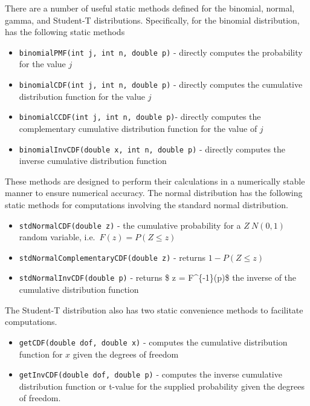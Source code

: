 \documentclass[
]{book}
\providecommand{\tightlist}{%
  \setlength{\itemsep}{0pt}\setlength{\parskip}{0pt}}
\theoremstyle{definition}
\theoremstyle{definition}
\theoremstyle{definition}
\theoremstyle{definition}
\theoremstyle{remark}
\begin{document}
There are a number of useful static methods defined for the binomial, normal, gamma, and Student-T distributions. Specifically, for the binomial distribution, has the following static methods

\begin{itemize}
\tightlist
\item
  \texttt{binomialPMF(int\ j,\ int\ n,\ double\ p)} - directly computes the probability for the value \(j\)
\item
  \texttt{binomialCDF(int\ j,\ int\ n,\ double\ p)} - directly computes the cumulative distribution function for the value \(j\)
\item
  \texttt{binomialCCDF(int\ j,\ int\ n,\ double\ p)}- directly computes the complementary cumulative distribution function for the value of \(j\)
\item
  \texttt{binomialInvCDF(double\ x,\ int\ n,\ double\ p)} - directly computes the inverse cumulative distribution function
\end{itemize}

These methods are designed to perform their calculations in a numerically stable manner to ensure numerical accuracy. The normal distribution has the following static methods for computations involving the standard normal distribution.

\begin{itemize}
\tightlist
\item
  \texttt{stdNormalCDF(double\ z)} - the cumulative probability for a \(Z ~ N(0,1)\) random variable, i.e.~\(F(z) = P(Z \leq z)\)
\item
  \texttt{stdNormalComplementaryCDF(double\ z)} - returns \(1-P(Z \leq z)\)
\item
  \texttt{stdNormalInvCDF(double\ p)} - returns \$ z = F\^{}\{-1\}(p)\$ the inverse of the cumulative distribution function
\end{itemize}

The Student-T distribution also has two static convenience methods to facilitate computations.

\begin{itemize}
\tightlist
\item
  \texttt{getCDF(double\ dof,\ double\ x)} - computes the cumulative distribution function for \(x\) given the degrees of freedom
\item
  \texttt{getInvCDF(double\ dof,\ double\ p)} - computes the inverse cumulative distribution function or t-value for the supplied probability given the degrees of freedom.
\end{itemize}
\end{document}
